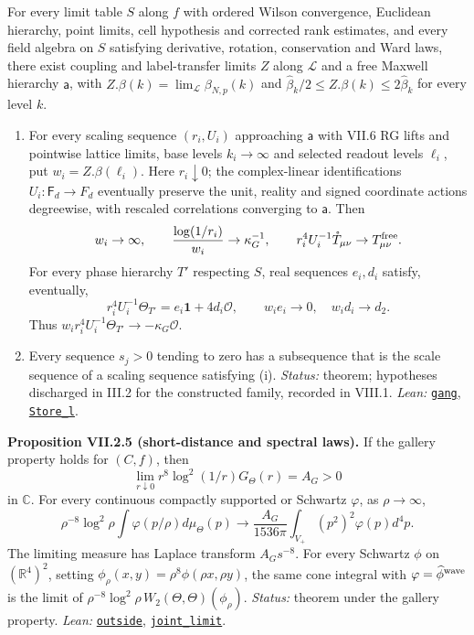 \documentclass[
  letterpaper,
  11pt]{article}
\begin{document}
For every limit table \(S\) along \(f\) with ordered Wilson convergence,
Euclidean hierarchy, point limits, cell hypothesis and corrected rank
estimates, and every field algebra on \(S\) satisfying derivative,
rotation, conservation and Ward laws, there exist coupling and
label-transfer limits \(Z\) along \(\mathcal L\) and a free Maxwell
hierarchy \(\mathsf a\), with
\(Z.\beta(k)=\lim_{\mathcal L}\beta_{N,p}(k)\) and
\(\hat\beta_k/2\le Z.\beta(k)\le2\hat\beta_k\) for every level \(k\).

\begin{enumerate}
\def\labelenumi{(\roman{enumi})}
\item
  For every scaling sequence \((r_i,U_i)\) approaching \(\mathsf a\)
  with VII.6 RG lifts and pointwise lattice limits, base levels
  \(k_i\to\infty\) and selected readout levels \(\ell_i\), put
  \(w_i=Z.\beta(\ell_i)\). Here \(r_i\downarrow0\); the complex-linear
  identifications \(U_i:\mathsf F_d\to F_d\) eventually preserve the
  unit, reality and signed coordinate actions degreewise, with rescaled
  correlations converging to \(\mathsf a\). Then
  \[w_i\to\infty,\qquad \frac{\log(1/r_i)}{w_i}\to\kappa_G^{-1},\qquad r_i^4U_i^{-1}\mathring T_{\mu\nu}\to T^{\rm free}_{\mu\nu}.\]
  For every phase hierarchy \(T'\) respecting \(S\), real sequences
  \(e_i,d_i\) satisfy, eventually,
  \[r_i^4U_i^{-1}\Theta_{T'}=e_i\mathbf1+4d_i\mathcal O,\qquad w_ie_i\to0,\quad w_id_i\to d_2.\]
  Thus \(w_ir_i^4U_i^{-1}\Theta_{T'}\to-\kappa_G\mathcal O\).
\item
  Every sequence \(s_j>0\) tending to zero has a subsequence that is the
  scale sequence of a scaling sequence satisfying (i). \emph{Status:}
  theorem; hypotheses discharged in III.2 for the constructed family,
  recorded in VIII.1. \emph{Lean:}
  \href{https://github.com/yang-mills-group/OpenAI-YM-20261028/blob/3456e5e75cf8d4cd558955a5c7638fba2d68f464/YM/TraceExtension/Chart/Line.lean\#L49-L56}{\texttt{gang}},
  \href{https://github.com/yang-mills-group/OpenAI-YM-20261028/blob/3456e5e75cf8d4cd558955a5c7638fba2d68f464/YM/TraceExtension/Chart/Time.lean\#L63-L68}{\texttt{Store\_l}}.
\end{enumerate}

\textbf{Proposition VII.2.5 (short-distance and spectral laws).} If the
gallery property holds for \((C,f)\), then
\[\lim_{r\downarrow0}r^8\log^2(1/r)G_\Theta(r)=A_G>0\] in \(\mathbb C\).
For every continuous compactly supported or Schwartz \(\varphi\), as
\(\rho\to\infty\),
\[\rho^{-8}\log^2\rho\int\varphi(p/\rho)d\mu_\Theta(p)\to\frac{A_G}{1536\pi}\int_{V_+}(p^2)^2\varphi(p)d^4p.\]
The limiting measure has Laplace transform \(A_Gs^{-8}\). For every
Schwartz \(\phi\) on \((\mathbb R^4)^2\), setting
\(\phi_\rho(x,y)=\rho^8\phi(\rho x,\rho y)\), the same cone integral
with \(\varphi=\widehat\phi^{\rm wave}\) is the limit of
\(\rho^{-8}\log^2\rho\,W_2(\Theta,\Theta)(\phi_\rho)\). \emph{Status:}
theorem under the gallery property. \emph{Lean:}
\href{https://github.com/yang-mills-group/OpenAI-YM-20261028/blob/3456e5e75cf8d4cd558955a5c7638fba2d68f464/YM/TraceExtension/Verse/Cape.lean\#L77-L88}{\texttt{outside}},
\href{https://github.com/yang-mills-group/OpenAI-YM-20261028/blob/3456e5e75cf8d4cd558955a5c7638fba2d68f464/YM/TraceExtension/LogScaling.lean\#L216-L222}{\texttt{joint\_limit}}.
\end{document}
